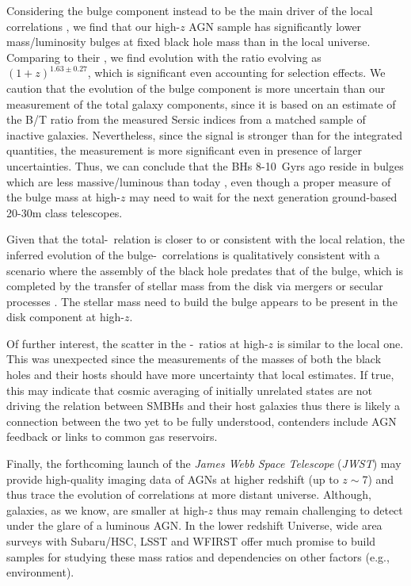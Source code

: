 \documentclass[apj]{emulateapj}
\begin{document}
Considering the bulge component instead to be the main driver of the local correlations \citep{Bennert11, Woo++08}, we find that our high-$z$ AGN sample has significantly lower mass/luminosity bulges at fixed black hole mass than in the local universe. Comparing to their \mbh, we find evolution with the ratio evolving as $(1+z)^{1.63\pm0.27}$, which is significant even accounting for selection effects. We caution that the evolution of the bulge component is more uncertain than our measurement of the total galaxy components, since it is based on an estimate of the B/T ratio from the measured Sersic indices from a matched sample of inactive galaxies. Nevertheless, since the signal is stronger than for the integrated quantities, the measurement is more significant even in presence of larger uncertainties.
Thus, we can conclude that the BHs 8-10~Gyrs ago reside in bulges which are less massive/luminous than today \citep[see also][]{Bennert11,Park15}, even though a proper measure of the bulge mass at high-$z$ may need to wait for the next generation ground-based 20-30m class telescopes. 

Given that the total-\mbh\ relation is closer to or consistent with the local relation, the inferred evolution of the bulge-\mbh\ correlations is qualitatively consistent with a scenario where the assembly of the black hole predates that of the bulge, which is completed by the transfer of stellar mass from the disk via mergers or secular processes \citep{Croton2006}. The stellar mass need to build the bulge appears to be present in the disk component at high-$z$.

Of further interest, the scatter in the \mbh-\smass\ ratios at high-$z$ is similar to the local one. This was unexpected since the measurements of the masses of both the black holes and their hosts should have more uncertainty that local estimates. If true, this may indicate that cosmic averaging of initially unrelated states \citep{Peng2007} are not driving the relation between SMBHs and their host galaxies thus there is likely a connection between the two yet to be fully understood, contenders include AGN feedback or links to common gas reservoirs.

Finally, the forthcoming launch of the {\it James Webb Space Telescope} ({\it JWST}) may provide high-quality imaging data of AGNs at higher redshift (up to $z\sim$7) and thus trace the evolution of correlations at more distant universe. Although, galaxies, as we know, are smaller at high-$z$ thus may remain challenging to detect under the glare of a luminous AGN. In the lower redshift Universe, wide area surveys with Subaru/HSC, LSST and WFIRST offer much promise to build samples for studying these mass ratios and dependencies on other factors (e.g., environment).  
\end{document}
